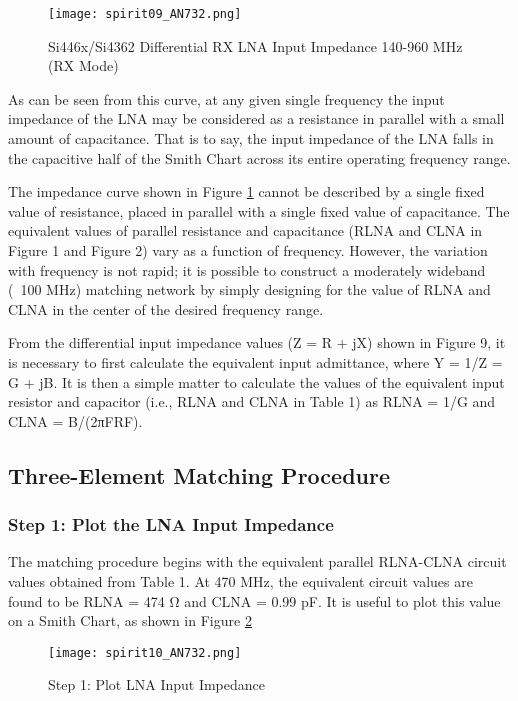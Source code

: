       \begin{figure}[ht!]  %
        \centering
        \texttt{[image: spirit09\_AN732.png]}
        \caption{Si446x/Si4362 Differential RX LNA Input Impedance 140-960 MHz (RX Mode) 
                 \cite[s.~4]{AN643SiliconLabs}}
        \label{EXP001:fig_spirit09}
      \end{figure}
       
      As can be seen from this curve, at any given single frequency the input impedance of the LNA 
      may be considered as a resistance in parallel with a small amount of capacitance. That is to 
      say, the input impedance of the LNA falls in the capacitive half of the Smith Chart across 
      its entire operating frequency range.
      
      The impedance curve shown in Figure \ref{EXP001:fig_spirit09} cannot be described by a single 
      fixed value of resistance, placed in parallel with a single fixed value of capacitance. The 
      equivalent values of  parallel resistance and capacitance (RLNA and CLNA in Figure 1 and 
      Figure 2) vary as a function of frequency. However, the variation with frequency is not 
      rapid; it is possible to construct a moderately wideband (~100 MHz) matching network by 
      simply designing for the value of RLNA and CLNA in the center of the desired frequency range.
      
      From the differential input impedance values (Z = R + jX) shown in Figure 9, it is necessary 
      to first calculate the equivalent input admittance, where Y = 1/Z = G + jB. It is then a 
      simple matter to calculate the values of the equivalent input resistor and capacitor (i.e., 
      RLNA and CLNA in Table 1) as RLNA = 1/G and CLNA = B/(2πFRF).
     
    \subsection{Three-Element Matching Procedure}
      \subsubsection{Step 1: Plot the LNA Input Impedance}
        The matching procedure begins with the equivalent parallel RLNA-CLNA circuit values 
        obtained from Table 1. At 470 MHz, the equivalent circuit values are found to be RLNA = 474 
        Ω and CLNA = 0.99 pF. It is useful to plot this value on a Smith Chart, as shown in Figure 
        \ref{EXP001:fig_spirit10}
        \begin{figure}[ht!]  %
          \centering
          \texttt{[image: spirit10\_AN732.png]}
          \caption{Step 1: Plot LNA Input Impedance \cite[s.~6]{AN643SiliconLabs}}
          \label{EXP001:fig_spirit10}
        \end{figure}
        
